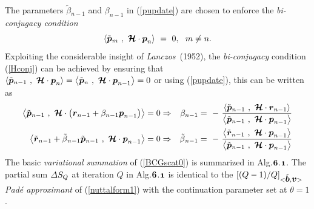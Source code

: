 The parameters $\tilde{ \beta }{}_{n-1}$ and ${ \beta }_{n-1}$ in 
(\ref{pupdate}) are 
chosen to enforce the {\em bi-conjugacy condition \/}
\begin{equation}	\label{Hconj}
	\left\langle{\tilde{\mbox{\boldmath$\mit p$\unboldmath}}{}_{m}\ ,\ {\mbox{\boldmath$\cal H$\unboldmath}} \cdot {\mbox{\boldmath$\mit p$\unboldmath}}_{ 
n}}\right\rangle\ =
	\ 0,\ \ m \ne n. 
\end{equation}
Exploiting the considerable 
insight of {\em Lanczos\/}~(1952),  the {\em bi-conjugacy\/} condition 
(\ref{Hconj}) can be 
 achieved by ensuring that $\left\langle{\tilde{\mbox{\boldmath$\mit p$\unboldmath}}{}_{n-1}\ ,
 \ {\mbox{\boldmath$\cal H$\unboldmath}} \cdot {\mbox{\boldmath$\mit p$\unboldmath}}_{ n}}\right\rangle=
 \left\langle{\tilde{\mbox{\boldmath$\mit p$\unboldmath}}{}_{n}\ ,
 \ {\mbox{\boldmath$\cal H$\unboldmath}} \cdot {\mbox{\boldmath$\mit p$\unboldmath}}_{ n-1}}\right\rangle= 0$ or using 
 (\ref{pupdate}), this can be written as 
 \begin{eqnarray} \label{betadef}
\left\langle{\tilde{\bmi  p}{}_{n-1}\ ,
 \ {\CB H} \cdot \left({\bmi  r}_{n-1}+{ \beta }_{n-1}{\bmi  p}_{n-1} 
\right)}\right\rangle = 0 & \Rightarrow &
{ \beta }_{n-1} =\ -\ {\frac{\left\langle{\tilde{\bmi  p}{}_{n-1}\ ,
\ {\CB H}  \cdot {\bmi   r}_{ n-1}}\right\rangle}
{\left\langle{\tilde{\bmi  p}{}_{n-1}\ ,\ {\CB H} \cdot 
{\bmi   p}_{ n-1}}\right\rangle}}\nonumber\\
\left\langle{ \tilde{\bmi  r}{}_{n-1}+\tilde{ \beta }{}_{n-1}
\tilde{\bmi  p}{}_{n-1} \ ,
 \ {\CB H} \cdot {\bmi  p}_{ n-1}}\right\rangle = 0 &\Rightarrow&
\tilde{ \beta }{}_{n-1} =\ -\ {\frac{\left\langle{\tilde{\bmi  r}{}_{n-1}\ 
,
\ {\CB H}  \cdot {\bmi   p}_{ n-1}}\right\rangle}
{\left\langle{\tilde{\bmi  p}{}_{n-1}\ ,\ {\CB H} \cdot 
{\bmi   p}_{ n-1}}\right\rangle}}
\end{eqnarray}
The basic {\em variational summation\/} of (\ref{BCGscat0}) is   
summarized 
in Alg.${\mbox{\boldmath$\mit 6$\unboldmath}}$.${\mbox{\boldmath$\mit 1$\unboldmath}}$. The partial sum ${\mit \Delta} {  S}_{Q} $ 
at 
iteration $Q$ in 
Alg.${\mbox{\boldmath$\mit 6$\unboldmath}}$.${\mbox{\boldmath$\mit 1$\unboldmath}}$ is 
identical to the $\left[{(Q-1)/Q}\right]_{<\tilde{\mbox{\boldmath$\mit b$\unboldmath}},{\mbox{\boldmath$\mit v$\unboldmath}}>}$ {\em Pad\'{e} approximant\/} of (\ref{nuttalform1}) with 
the 
 continuation parameter set at $\theta=1$.

 


